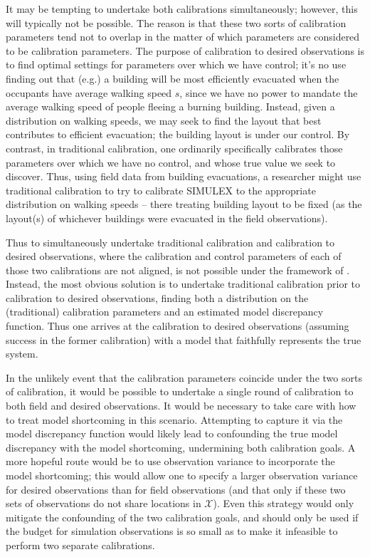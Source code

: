 \documentclass{article}
\begin{document}
It may be tempting to undertake both calibrations simultaneously; however, this will typically not be possible. The reason is that these two sorts of calibration parameters tend not to overlap in the matter of which parameters are considered to be calibration parameters. The purpose of calibration to desired observations is to find optimal settings for parameters over which we have control; it's no use finding out that (e.g.) a building will be most efficiently evacuated when the occupants have average walking speed $s$, since we have no power to mandate the average walking speed of people fleeing a burning building. Instead, given a distribution on walking speeds, we may seek to find the layout that best contributes to efficient evacuation; the building layout is under our control. By contrast, in traditional calibration, one ordinarily specifically calibrates those parameters over which we have no control, and whose true value we seek to discover. Thus, using field data from building evacuations, a researcher might use traditional calibration to try to calibrate SIMULEX to the appropriate distribution on walking speeds -- there treating building layout to be fixed (as the layout(s) of whichever buildings were evacuated in the field observations).

Thus to simultaneously undertake traditional calibration and calibration to desired observations, where the calibration and control parameters of each of those two calibrations are not aligned, is not possible under the framework of \cite{Kennedy2001}. Instead, the most obvious solution is to undertake traditional calibration prior to calibration to desired observations, finding both a distribution on the (traditional) calibration parameters and an estimated model discrepancy function. Thus one arrives at the calibration to desired observations (assuming success in the former calibration) with a model that faithfully represents the true system.

In the unlikely event that the calibration parameters coincide under the two sorts of calibration, it would be possible to undertake a single round of calibration to both field and desired observations. It would be necessary to take care with how to treat model shortcoming in this scenario. Attempting to capture it via the model discrepancy function would likely lead to confounding the true model discrepancy with the model shortcoming, undermining both calibration goals. A more hopeful route would be to use observation variance to incorporate the model shortcoming; this would allow one to specify a larger observation variance for desired observations than for field observations (and that only if these two sets of observations do not share locations in $\mathcal X$). Even this strategy would only mitigate the confounding of the two calibration goals, and should only be used if the budget for simulation observations is so small as to make it infeasible to perform two separate calibrations.
\end{document}
